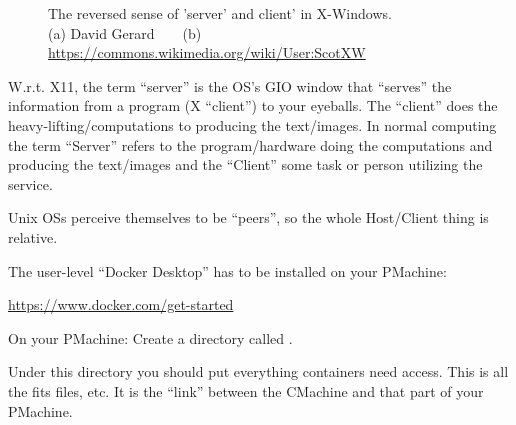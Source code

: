 \documentclass[letter,11pt,oneside]{article}
\newcommand{\dhl}[1]{{\color{verbcolor}{\texttt#1}}}
\begin{document}
\begin{figure}[h!]
\centering
{}%
\qquad
{}%
\caption[X11 vs Wayland]{The reversed sense of 'server' and client' in X-Windows.\\
  {\tiny{(a) David Gerard ~ ~ (b) \url{https://commons.wikimedia.org/wiki/User:ScotXW}}}} 
\label{figure:ServerClient}
\end{figure}


W.r.t. X11, the term ``server'' is the OS's GIO window that ``serves''
the information from a program (X ``client'') to your eyeballs. The
``client'' does the heavy-lifting/computations to producing the
text/images. In normal computing the term ``Server'' refers to the
program/hardware doing the computations and producing the text/images
and the ``Client'' some task or person utilizing the service.

Unix OSs perceive themselves to be ``peers'', so the whole
Host/Client thing is relative.

The user-level ``Docker Desktop'' has to be installed on your PMachine:

\url{https://www.docker.com/get-started}

On your PMachine: Create a directory called \dhl{\$HOME/Astro}.

Under this directory you should put everything containers need
access. This is all the fits files, etc. It is the ``link'' between
the CMachine and that part of your PMachine.
\end{document}
